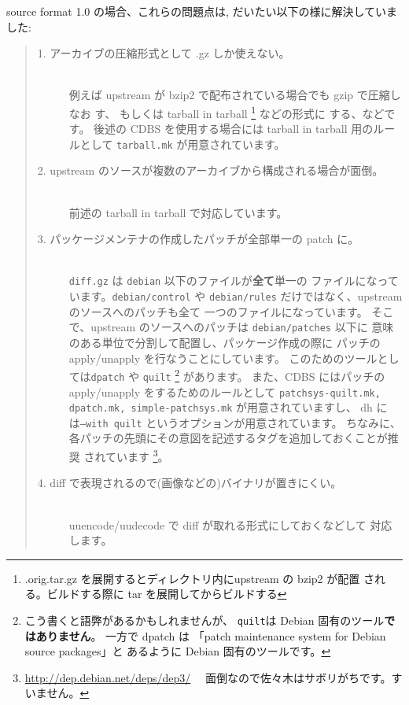 \documentclass[mingoth,a4paper]{jsarticle}
\begin{document}
source format 1.0 の場合、これらの問題点は, だいたい以下の様に解決していました:
\begin{quote}
    \begin{description}
          \item[1. アーカイブの圧縮形式として .gz しか使えない。] 　\\
        例えば upstream が bzip2 で配布されている場合でも gzip で圧縮しなお
        す、 もしくは tarball in tarball \footnote{%
          .orig.tar.gz を展開するとディレクトリ内にupstream の bzip2 が配置
          される。ビルドする際に tar を展開してからビルドする} などの形式に
        する、などです。
        後述の CDBS を使用する場合には tarball in tarball 用のルールとして
        {\tt tarball.mk} が用意されています。
           \item[%
        2. upstream のソースが複数のアーカイブから構成される場合が面倒。]　\\
        前述の tarball in tarball で対応しています。
          \item[3. パッケージメンテナの作成したパッチが全部単一の patch に。]
        　\\
        {\tt diff.gz} は {\tt debian} 以下のファイルが{\bf 全て}単一の
        ファイルになっています。{\tt debian/control} や 
        {\tt debian/rules} だけではなく、upstream のソースへのパッチも全て
        一つのファイルになっています。
        そこで、upstream のソースへのパッチは {\tt debian/patches} 以下に
        意味のある単位で分割して配置し、パッケージ作成の際に
        パッチの apply/unapply を行なうことにしています。
        このためのツールとしては{\tt dpatch} や
        {\tt quilt}
        \footnote{%
          こう書くと語弊があるかもしれませんが、
          {\tt quilt}は Debian 固有のツール{\bf ではありません}。
          一方で dpatch は
          「patch maintenance system for Debian source packages」と
          あるように Debian 固有のツールです。
        }
        があります。
        また、CDBS にはパッチの apply/unapply をするためのルールとして
        {\tt patchsys-quilt.mk, dpatch.mk, simple-patchsys.mk}
        が用意されていますし、
        dh には{\tt --with quilt} というオプションが用意されています。
        ちなみに、
        各パッチの先頭にその意図を記述するタグを追加しておくことが推奨
        されています
        \footnote{\url{http://dep.debian.net/deps/dep3/}　
          面倒なので佐々木はサボリがちです。すいません。}。
          \item[4. diff で表現されるので(画像などの)バイナリが置きにくい。]　\\
        uuencode/uudecode で diff が取れる形式にしておくなどして
         対応します。
    \end{description}
\end{quote}
\end{document}
